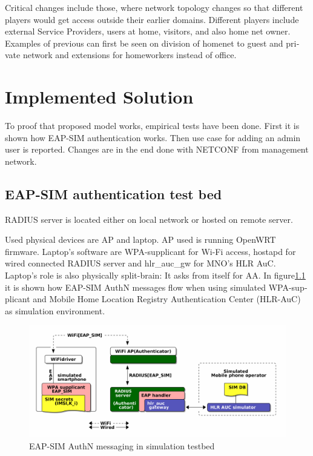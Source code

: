 \documentclass[12pt,a4paper,english]{tutthesis}
\begin{document}
\begin{otherlanguage}{english}
Critical changes include those, where network topology changes so
that different players would get access outside their earlier domains.
Different players include external Service Providers, users at home,
visitors, and also home net owner. Examples of previous can first be
seen on division of homenet to guest and private network and
extensions for homeworkers instead of office.







\chapter{Implemented Solution}
\label{sec-5}


To proof that proposed model works, empirical tests have been done.
First it is shown how EAP-SIM authentication works. Then use case for
adding an admin user is reported. Changes are in the end done with
NETCONF from management network.

\section{EAP-SIM authentication test bed}
\label{sec-5-1}
RADIUS server is located either on local network or hosted on remote
server.

Used physical devices are AP and laptop.  AP used is running OpenWRT
firmware.  Laptop's software are WPA-supplicant for Wi-Fi access,
hostapd for wired connected RADIUS server and hlr\_auc\_gw for MNO's
HLR AuC. Laptop's role is also physically split-brain: It asks from itself for AA. 
In figure\ref{eap-sim-testbed} it is shown how EAP-SIM AuthN messages flow when using 
simulated WPA-supplicant and Mobile Home Location Registry Authentication Center (HLR-AuC) as simulation environment.

\begin{figure}[htb]
\centering
\includegraphics[width=.9\linewidth]{demoinfra.png}
\caption{\label{eap-sim-testbed}EAP-SIM AuthN messaging in simulation testbed}
\end{figure}





\end{otherlanguage}
\end{document}
